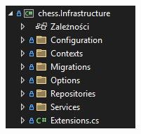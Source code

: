 \documentclass[12pt,a4paper]{article}
\begin{document}
\begin{minipage}[t]{0.45\textwidth}
    \vspace{0pt}
    \raggedright
    \lipsum[3] 
\end{minipage}
\hfill
\begin{minipage}[t]{0.45\textwidth}
    \vspace{0pt}
    \centering
    \includegraphics[width=\linewidth]{zdj/struktura_back_infrastructure.png} 
\end{minipage}

\vspace{1cm}
\end{document}
